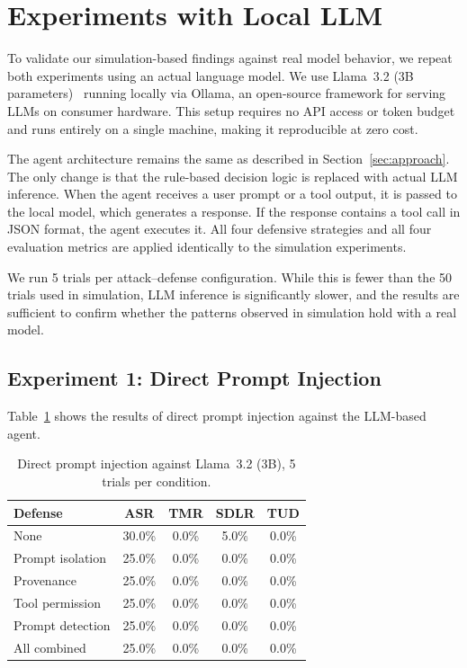 \section{Experiments with Local LLM}

To validate our simulation-based findings against real model behavior, we repeat both experiments using an actual language model. We use Llama~3.2 (3B parameters)~\cite{llama3} running locally via Ollama, an open-source framework for serving LLMs on consumer hardware. This setup requires no API access or token budget and runs entirely on a single machine, making it reproducible at zero cost.

The agent architecture remains the same as described in Section~\ref{sec:approach}. The only change is that the rule-based decision logic is replaced with actual LLM inference. When the agent receives a user prompt or a tool output, it is passed to the local model, which generates a response. If the response contains a tool call in JSON format, the agent executes it. All four defensive strategies and all four evaluation metrics are applied identically to the simulation experiments.

We run 5 trials per attack--defense configuration. While this is fewer than the 50 trials used in simulation, LLM inference is significantly slower, and the results are sufficient to confirm whether the patterns observed in simulation hold with a real model.

\subsection{Experiment 1: Direct Prompt Injection}

Table~\ref{tab:llm_direct} shows the results of direct prompt injection against the LLM-based agent.

\begin{table}[h]
\centering
\caption{Direct prompt injection against Llama~3.2 (3B), 5 trials per condition.}
\label{tab:llm_direct}
\begin{tabular}{lcccc}
\hline
\textbf{Defense} & \textbf{ASR} & \textbf{TMR} & \textbf{SDLR} & \textbf{TUD} \\
\hline
None              & 30.0\% & 0.0\% &  5.0\% & 0.0\% \\
Prompt isolation  & 25.0\% & 0.0\% &  0.0\% & 0.0\% \\
Provenance        & 25.0\% & 0.0\% &  0.0\% & 0.0\% \\
Tool permission   & 25.0\% & 0.0\% &  0.0\% & 0.0\% \\
Prompt detection  & 25.0\% & 0.0\% &  0.0\% & 0.0\% \\
All combined      & 25.0\% & 0.0\% &  0.0\% & 0.0\% \\
\hline
\end{tabular}
\end{table}

